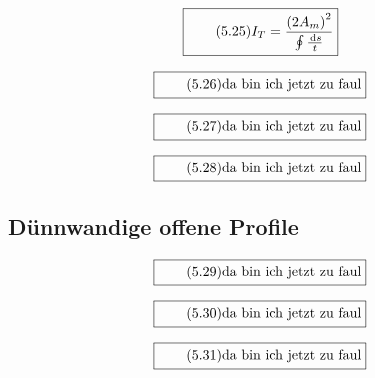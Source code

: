 \documentclass[11pt]{article}
\newcommand{\1}{ {\mathds{1}} }
\newcommand{\td}{\,\text{d}}
\begin{document}
\begin{multicols}{2}
		\begin{equation}
			\boxed{
				\tag{5.25}
				\begin{split}
					I_T = \frac{\left( 2 A_m\right)^2}{\oint\frac{\td s}{t}}
				\end{split}
			}
		\end{equation}

		\begin{equation}
			\boxed{
				\tag{5.26}
				\begin{split}
					\text{da bin ich jetzt zu faul}
				\end{split}
			}
		\end{equation}

		\begin{equation}
			\boxed{
				\tag{5.27}
				\begin{split}
					\text{da bin ich jetzt zu faul}
				\end{split}
			}
		\end{equation}
		
		\begin{equation}
			\boxed{
				\tag{5.28}
				\begin{split}
					\text{da bin ich jetzt zu faul}
				\end{split}
			}
		\end{equation}

		\subsection{Dünnwandige offene Profile}

		\begin{equation}
			\boxed{
				\tag{5.29}
				\begin{split}
					\text{da bin ich jetzt zu faul}
				\end{split}
			}
		\end{equation}

		\begin{equation}
			\boxed{
				\tag{5.30}
				\begin{split}
					\text{da bin ich jetzt zu faul}
				\end{split}
			}
		\end{equation}

		\begin{equation}
			\boxed{
				\tag{5.31}
				\begin{split}
					\text{da bin ich jetzt zu faul}
				\end{split}
			}
		\end{equation}


\end{multicols}
\end{document}

